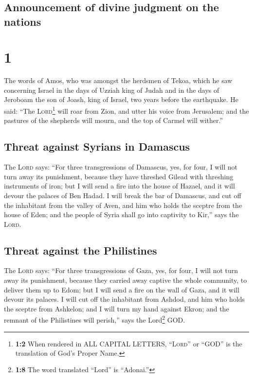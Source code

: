 \hypertarget{announcement-of-divine-judgment-on-the-nations}{%
\subsection{Announcement of divine judgment on the
nations}\label{announcement-of-divine-judgment-on-the-nations}}

\hypertarget{section}{%
\section{1}\label{section}}

 The words of Amos, who was amongst the herdsmen of Tekoa,
which he saw concerning Israel in the days of Uzziah king of Judah and
in the days of Jeroboam the son of Joash, king of Israel, two years
before the earthquake.  He said: ``The
\textsc{Lord}\footnote{\textbf{1:2} When rendered in ALL CAPITAL
  LETTERS, ``\textsc{Lord}'' or ``GOD'' is the translation of God's
  Proper Name.} will roar from Zion, and utter his voice from Jerusalem;
and the pastures of the shepherds will mourn, and the top of Carmel will
wither.''

\hypertarget{threat-against-syrians-in-damascus}{%
\subsection{Threat against Syrians in
Damascus}\label{threat-against-syrians-in-damascus}}

 The \textsc{Lord} says: ``For three transgressions of
Damascus, yes, for four, I will not turn away its punishment, because
they have threshed Gilead with threshing instruments of iron;
 but I will send a fire into the house of Hazael, and it
will devour the palaces of Ben Hadad.  I will break the
bar of Damascus, and cut off the inhabitant from the valley of Aven, and
him who holds the sceptre from the house of Eden; and the people of
Syria shall go into captivity to Kir,'' says the \textsc{Lord}.

\hypertarget{threat-against-the-philistines}{%
\subsection{Threat against the
Philistines}\label{threat-against-the-philistines}}

 The \textsc{Lord} says: ``For three transgressions of
Gaza, yes, for four, I will not turn away its punishment, because they
carried away captive the whole community, to deliver them up to Edom;
 but I will send a fire on the wall of Gaza, and it will
devour its palaces.  I will cut off the inhabitant from
Ashdod, and him who holds the sceptre from Ashkelon; and I will turn my
hand against Ekron; and the remnant of the Philistines will perish,''
says the Lord\footnote{\textbf{1:8} The word translated ``Lord'' is
  ``Adonai.''} GOD.


